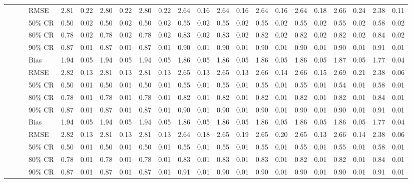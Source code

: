 \begin{table}[ht]
\begin{tabular}{rrllrrrrrrrrrrrrrrrrrr}
   & & & RMSE & 2.81 & 0.22 & 2.80 & 0.22 & 2.80 & 0.22 & 2.64 & 0.16 & 2.64 & 0.16 & 2.64 & 0.16 & 2.64 & 0.18 & 2.66 & 0.24 & 2.38 & 0.11 \\ 
   & & & 50\% CR & 0.50 & 0.02 & 0.50 & 0.02 & 0.50 & 0.02 & 0.55 & 0.02 & 0.55 & 0.02 & 0.55 & 0.02 & 0.55 & 0.02 & 0.55 & 0.02 & 0.58 & 0.02 \\ 
   & & & 80\% CR & 0.78 & 0.02 & 0.78 & 0.02 & 0.78 & 0.02 & 0.83 & 0.02 & 0.83 & 0.02 & 0.82 & 0.02 & 0.82 & 0.02 & 0.82 & 0.02 & 0.84 & 0.02 \\ 
   & & & 90\% CR & 0.87 & 0.01 & 0.87 & 0.01 & 0.87 & 0.01 & 0.90 & 0.01 & 0.90 & 0.01 & 0.90 & 0.01 & 0.90 & 0.01 & 0.90 & 0.01 & 0.91 & 0.01 \\ 
   & & & Bias & 1.94 & 0.05 & 1.94 & 0.05 & 1.94 & 0.05 & 1.86 & 0.05 & 1.86 & 0.05 & 1.86 & 0.05 & 1.86 & 0.05 & 1.87 & 0.05 & 1.77 & 0.04 \\ 
   & & & RMSE & 2.82 & 0.13 & 2.81 & 0.13 & 2.81 & 0.13 & 2.65 & 0.13 & 2.65 & 0.13 & 2.66 & 0.14 & 2.66 & 0.15 & 2.69 & 0.21 & 2.38 & 0.06 \\ 
   & & & 50\% CR & 0.50 & 0.01 & 0.50 & 0.01 & 0.50 & 0.01 & 0.55 & 0.01 & 0.55 & 0.01 & 0.55 & 0.01 & 0.55 & 0.01 & 0.54 & 0.01 & 0.58 & 0.01 \\ 
   & & & 80\% CR & 0.78 & 0.01 & 0.78 & 0.01 & 0.78 & 0.01 & 0.82 & 0.01 & 0.82 & 0.01 & 0.82 & 0.01 & 0.82 & 0.01 & 0.82 & 0.01 & 0.84 & 0.01 \\ 
   & & & 90\% CR & 0.87 & 0.01 & 0.87 & 0.01 & 0.87 & 0.01 & 0.90 & 0.01 & 0.90 & 0.01 & 0.90 & 0.01 & 0.90 & 0.01 & 0.90 & 0.01 & 0.91 & 0.01 \\ 
   & & & Bias & 1.94 & 0.05 & 1.94 & 0.05 & 1.94 & 0.05 & 1.86 & 0.05 & 1.86 & 0.05 & 1.86 & 0.05 & 1.86 & 0.05 & 1.86 & 0.05 & 1.77 & 0.04 \\ 
   & & & RMSE & 2.82 & 0.13 & 2.81 & 0.13 & 2.81 & 0.13 & 2.64 & 0.18 & 2.65 & 0.19 & 2.65 & 0.20 & 2.65 & 0.13 & 2.66 & 0.14 & 2.38 & 0.06 \\ 
   & & & 50\% CR & 0.50 & 0.01 & 0.50 & 0.01 & 0.50 & 0.01 & 0.55 & 0.01 & 0.55 & 0.01 & 0.55 & 0.01 & 0.55 & 0.01 & 0.55 & 0.01 & 0.58 & 0.01 \\ 
   & & & 80\% CR & 0.78 & 0.01 & 0.78 & 0.01 & 0.78 & 0.01 & 0.83 & 0.01 & 0.83 & 0.01 & 0.83 & 0.01 & 0.82 & 0.01 & 0.82 & 0.01 & 0.84 & 0.01 \\ 
   & & & 90\% CR & 0.87 & 0.01 & 0.87 & 0.01 & 0.87 & 0.01 & 0.91 & 0.01 & 0.90 & 0.01 & 0.90 & 0.01 & 0.90 & 0.01 & 0.90 & 0.01 & 0.91 & 0.01 \\ 

\end{tabular}
\end{table}
